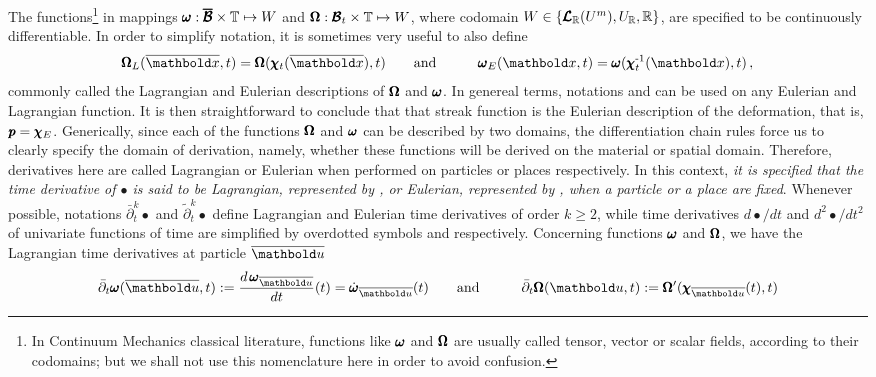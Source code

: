The functions\footnote{In Continuum Mechanics classical literature, functions like $\pmb{\omega}$ and $\pmb{\Omega}$ are usually called tensor, vector or scalar fields, according to their codomains; but we shall not use this nomenclature here in order to avoid confusion.} in  mappings $\pmb{\omega} : \pmb{\overline{\mathcal{B}}}\times\mathbb{T} \mapsto W$ and $\pmb{\Omega} : \pmb{\mathcal{B}}_t\times\mathbb{T} \mapsto W$, where codomain $W\in\{\pmb{\mathcal{L}}_{\mathbb{R}}(U^m),U_{\mathbb{R}},\mathbb{R}\}$, are specified to be continuously differentiable. In order to simplify notation, it is sometimes very useful to also define  
\begin{alignat}{3}\label{eq:LagEulDesc} 
\tnr{\Omega}_L(\overline{\vto{x}},t)=\tnr{\Omega}(\fua{\tnr{\chi}_t}{\overline{\vto{x}}},t)&\qquad \text{and}\qquad & \tnr{\omega}_E(\vto{x},t)=\tnr{\omega}(\fua{\tnr{\chi}_t^\text{-1}}{{\vto{x}}},t)\,,
\end{alignat}
commonly called the Lagrangian and Eulerian descriptions of $\pmb{\Omega}$ and $\pmb{\omega}$. In genereal terms, notations  and  can be used on any Eulerian and Lagrangian function. It is then straightforward to conclude that that streak function  is the Eulerian description of the deformation, that is, $\pmb{p}=\pmb{\chi}_E$. Generically, since each of the functions $\pmb{\Omega}$ and $\pmb{\omega}$ can be described by two domains, the differentiation chain rules force us to clearly specify the domain of derivation, namely, whether these functions will be derived on the material or spatial domain. Therefore, derivatives here are called Lagrangian or Eulerian when performed on particles or places respectively. In this context, \emph{it is specified that the time derivative of $\bullet$ is said to be Lagrangian, represented by , or Eulerian, represented by , when a particle or a place are fixed}. Whenever possible, notations ${\bar{\partial}}_t^k\bullet$ and ${\tilde{\partial}}_t^k\bullet$ define Lagrangian and Eulerian time derivatives of order $k\geqslant 2$, while time derivatives $d\bullet/dt$ and $d^2\bullet/dt^2$ of univariate functions of time are simplified by overdotted symbols  and  respectively. Concerning functions $\pmb{\omega}$ and $\pmb{\Omega}$, we have the Lagrangian time derivatives at particle $\overline{\vto{u}}$
\begin{alignat}{3}\label{eq:LagDesc} 
\bar{\partial}_t\tnr{\omega}(\overline{\vto{u}},t):=\dfrac{d\,\tnr{\omega}_{\overline{\vto{u}}}}{dt}(t)={\dot{\tnr{\omega}}}_{\overline{\vto{u}}}(t)&\qquad \text{and}\qquad & \bar{\partial}_t\tnr{\Omega}(\vto{u},t):=\tnr{\Omega}'(\fua{\tnr{\chi}_{\overline{\vto{u}}}}{t},t)
\end{alignat}

